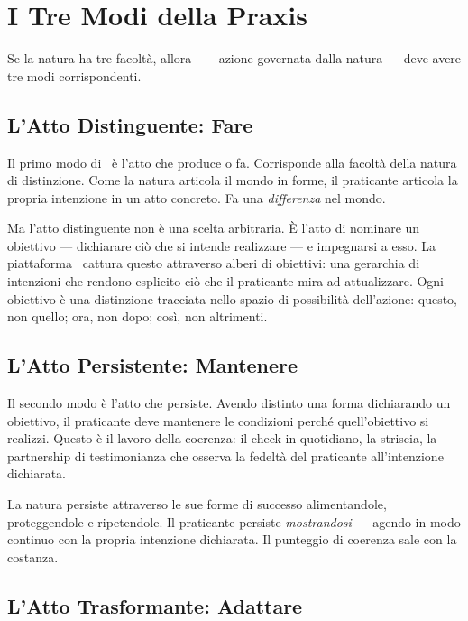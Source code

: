 \section{I Tre Modi della Praxis}

Se la natura ha tre facolt\`a, allora \praxis\ --- azione governata
dalla natura --- deve avere tre modi corrispondenti.

\subsection{L'Atto Distinguente: Fare}

Il primo modo di \praxis\ \`e l'atto che produce o fa. Corrisponde
alla facolt\`a della natura di distinzione. Come la natura articola
il mondo in forme, il praticante articola la propria intenzione in un
atto concreto. Fa una \emph{differenza} nel mondo.

Ma l'atto distinguente non \`e una scelta arbitraria. \`E l'atto di
nominare un obiettivo --- dichiarare ci\`o che si intende realizzare ---
e impegnarsi a esso. La piattaforma \praxis\ cattura questo attraverso
alberi di obiettivi: una gerarchia di intenzioni che rendono esplicito
ci\`o che il praticante mira ad attualizzare. Ogni obiettivo \`e una
distinzione tracciata nello spazio-di-possibilit\`a dell'azione: questo,
non quello; ora, non dopo; cos\`i, non altrimenti.

\subsection{L'Atto Persistente: Mantenere}

Il secondo modo \`e l'atto che persiste. Avendo distinto una forma
dichiarando un obiettivo, il praticante deve mantenere le condizioni
perch\'e quell'obiettivo si realizzi. Questo \`e il lavoro della
coerenza: il check-in quotidiano, la striscia, la partnership di
testimonianza che osserva la fedelt\`a del praticante all'intenzione
dichiarata.

La natura persiste attraverso le sue forme di successo alimentandole,
proteggendole e ripetendole. Il praticante persiste \emph{mostrandosi}
--- agendo in modo continuo con la propria intenzione dichiarata. Il
punteggio di coerenza sale con la costanza.

\subsection{L'Atto Trasformante: Adattare}

